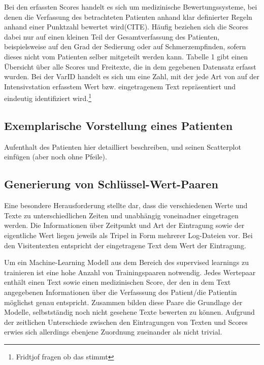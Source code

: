 Bei den erfassten Scores handelt es sich um medizinische Bewertungssysteme, bei denen die Verfassung des betrachteten Patienten anhand klar definierter Regeln anhand einer Punktzahl bewertet wird(CITE). Häufig beziehen sich die Scores dabei nur auf einen kleinen Teil der Gesamtverfassung des Patienten, beispielsweise auf den Grad der Sedierung oder auf Schmerzempfinden, sofern dieses nicht vom Patienten selber mitgeteilt werden kann. Tabelle 1 gibt einen Übersicht über alle Scores und Freitexte, die in dem gegebenen Datensatz erfasst wurden. Bei der VarID handelt es sich um eine Zahl, mit der jede Art von auf der Intensivstation erfasstem Wert bzw. eingetragenem Text repräsentiert und eindeutig identifiziert wird.\footnote{Fridtjof fragen ob das stimmt} 




\subsection{Exemplarische Vorstellung eines Patienten} %
Aufenthalt des Patienten hier detailliert beschreiben, und seinen Scatterplot einfügen (aber noch ohne Pfeile).

\subsection{Generierung von Schlüssel-Wert-Paaren}
Eine besondere Herausforderung stellte dar, dass die verschiedenen Werte und Texte zu unterschiedlichen Zeiten und unabhängig voneinadner eingetragen werden. Die Informationen über Zeitpunkt und Art der Eintragung sowie der eigentliche Wert liegen jeweils als Tripel in Form mehrerer Log-Dateien vor. Bei den Visitentexten entspricht der eingetragene Text dem Wert der Eintragung.

Um ein Machine-Learning Modell aus dem Bereich des supervised learnings zu trainieren ist eine hohe Anzahl von Trainingspaaren notwendig. Jedes Wertepaar enthält einen Text sowie einen medizinischen Score, der den in dem Text angegebenen Informationen über die Verfasssung des Patient/die Patientin möglichst genau entspricht. Zusammen bilden diese Paare die Grundlage der Modelle, selbstständig noch nicht gesehene Texte bewerten zu können.
Aufgrund der zeitlichen Unterschiede zwischen den Eintragungen von Texten und Scores erwies sich allerdings ebenjene Zuordnung zueinander als nicht trivial.

